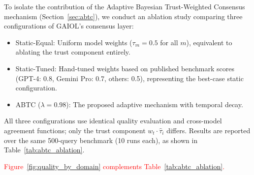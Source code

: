 \documentclass{iopjournal}
\newcommand{\rev}[1]{\textcolor{red}{#1}}
\begin{document}
To isolate the contribution of the Adaptive Bayesian Trust-Weighted Consensus mechanism (Section~\ref{sec:abtc}), we conduct an ablation study comparing three configurations of GAIOL's consensus layer:

\begin{itemize}
    \item Static-Equal: Uniform model weights ($\tau_m = 0.5$ for all $m$), equivalent to ablating the trust component entirely.
    \item Static-Tuned: Hand-tuned weights based on published benchmark scores (GPT-4: 0.8, Gemini Pro: 0.7, others: 0.5), representing the best-case static configuration.
    \item ABTC ($\lambda = 0.98$): The proposed adaptive mechanism with temporal decay.
\end{itemize}

All three configurations use identical quality evaluation and cross-model agreement functions; only the trust component $w_t \cdot \hat{\tau}_i$ differs. Results are reported over the same 500-query benchmark (10 runs each), as shown in Table~\ref{tab:abtc_ablation}.

\begin{table}[!ht]
\centering
\caption{ABTC Ablation: Quality Score by Task Domain}
\label{tab:abtc_ablation}
\end{table}

\rev{Figure~\ref{fig:quality_by_domain} complements Table~\ref{tab:abtc_ablation}.}
\end{document}
